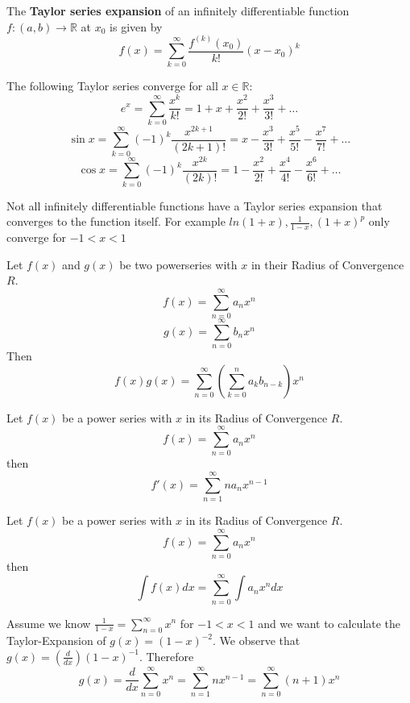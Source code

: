 \begin{definition}
    The \textbf{Taylor series expansion} of an infinitely differentiable function $f: (a, b) \to \mathbb{R}$ at $x_0$ is given by 
    $$f(x) = \sum_{k=0}^\infty \frac{f^{(k)}(x_0)}{k!}(x-x_0)^k$$
\end{definition}

\begin{example}
    The following Taylor series converge for all $x \in \mathbb{R}$:
    $$e^x = \sum_{k=0}^\infty \frac{x^k}{k!} = 1 + x + \frac{x^2}{2!} + \frac{x^3}{3!} + \dots$$
    $$\sin{x} = \sum_{k=0}^\infty (-1)^k \frac{x^{2k+1}}{(2k+1)!} = x - \frac{x^3}{3!} + \frac{x^5}{5!} - \frac{x^7}{7!} + \dots$$
    $$\cos{x} = \sum_{k=0}^\infty (-1)^k \frac{x^{2k}}{(2k)!} = 1 - \frac{x^2}{2!} + \frac{x^4}{4!} - \frac{x^6}{6!} + \dots$$
\end{example}

\begin{important}
    Not all infinitely differentiable functions have a Taylor series expansion that converges to the function itself. For example $ln(1+x), \frac{1}{1-x}, (1+x)^p$ only converge for $-1 \lt x \lt 1$
\end{important}

\begin{theorem}
    Let $f(x)$ and $g(x)$ be two powerseries with $x$ in their Radius of Convergence $R$.
    $$f(x) = \sum_{n=0}^\infty a_n x^n$$ 
    $$g(x) = \sum_{n=0}^\infty b_n x^n$$
    Then
    $$f(x)g(x) = \sum_{n=0}^\infty \left(\sum_{k=0}^n a_k b_{n-k}\right) x^n$$
\end{theorem}

\begin{theorem}
    Let $f(x)$ be a power series with $x$ in its Radius of Convergence $R$.
    $$f(x) = \sum_{n=0}^\infty a_n x^n$$
    then
    $$f'(x) = \sum_{n=1}^\infty n a_n x^{n-1}$$
\end{theorem}

\begin{theorem}
    Let $f(x)$ be a power series with $x$ in its Radius of Convergence $R$.
    $$f(x) = \sum_{n=0}^\infty a_n x^n$$
    then
    $$\int f(x) dx = \sum_{n=0}^\infty \int a_n x^n dx$$
\end{theorem}

\begin{example}
    Assume we know $\frac{1}{1-x} = \sum_{n=0}^\infty x^n$ for $-1 \lt x \lt 1$ and we want to calculate the Taylor-Expansion of $g(x) = (1-x)^{-2}$.
    We observe that $g(x) = (\frac{d}{dx}) (1-x)^{-1}$. Therefore 
    $$g(x) = \frac{d}{dx} \sum_{n=0}^\infty x^n = \sum_{n=1}^\infty n x^{n-1} = \sum_{n=0}^\infty (n+1)x^n$$
\end{example}
